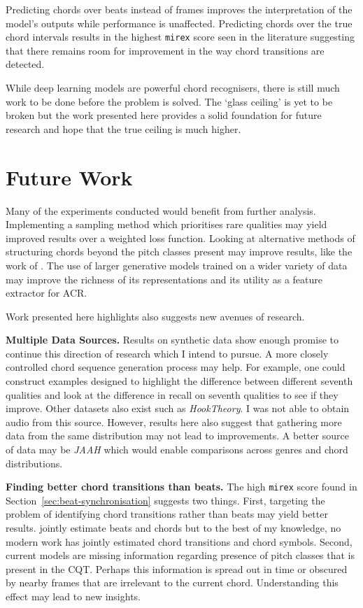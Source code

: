 Predicting chords over beats instead of frames improves the interpretation of the model's outputs while performance is unaffected. Predicting chords over the true chord intervals results in the highest \texttt{mirex} score seen in the literature suggesting that there remains room for improvement in the way chord transitions are detected.

While deep learning models are powerful chord recognisers, there is still much work to be done before the problem is solved. The `glass ceiling' is yet to be broken but the work presented here provides a solid foundation for future research and hope that the true ceiling is much higher.

\section{Future Work}

Many of the experiments conducted would benefit from further analysis. Implementing a sampling method which prioritises rare qualities may yield improved results over a weighted loss function. Looking at alternative methods of structuring chords beyond the pitch classes present may improve results, like the work of \citet{ACRLargeVocab1}.  The use of larger generative models trained on a wider variety of data may improve the richness of its representations and its utility as a feature extractor for ACR.

Work presented here highlights also suggests new avenues of research.

\textbf{Multiple Data Sources.} Results on synthetic data show enough promise to continue this direction of research which I intend to pursue. A more closely controlled chord sequence generation process may help. For example, one could construct examples designed to highlight the difference between different seventh qualities and look at the difference in recall on seventh qualities to see if they improve. Other datasets also exist such as \emph{HookTheory}. I was not able to obtain audio from this source. However, results here also suggest that gathering more data from the same distribution may not lead to improvements. A better source of data may be \emph{JAAH} which would enable comparisons across genres and chord distributions.

\textbf{Finding better chord transitions than beats.} The high \texttt{mirex} score found in Section~\ref{sec:beat-synchronisation} suggests two things. First, targeting the problem of identifying chord transitions rather than beats may yield better results. \citet{ChorusAlignmentJAAH} jointly estimate beats and chords but to the best of my knowledge, no modern work has jointly estimated chord transitions and chord symbols. Second, current models are missing information regarding presence of pitch classes that is present in the CQT. Perhaps this information is spread out in time or obscured by nearby frames that are irrelevant to the current chord. Understanding this effect may lead to new insights.

